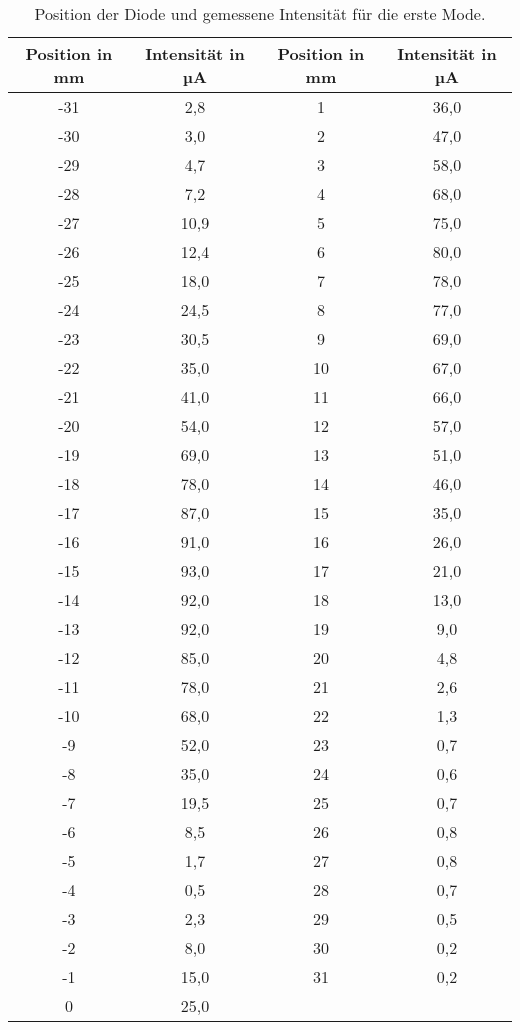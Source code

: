     \begin{table}
      \centering
      \begin{tabular}{c c | c c}
        \toprule
        Position in mm & Intensität in µA & Position in mm & Intensität in µA\\
        \midrule
        -31  &  2,8  &    1  & 36,0\\
        -30  &  3,0  &    2  & 47,0\\
        -29  &  4,7  &    3  & 58,0\\
        -28  &  7,2  &    4  & 68,0\\
        -27  & 10,9  &    5  & 75,0\\
        -26  & 12,4  &    6  & 80,0\\
        -25  & 18,0  &    7  & 78,0\\
        -24  & 24,5  &    8  & 77,0\\
        -23  & 30,5  &    9  & 69,0\\
        -22  & 35,0  &   10  & 67,0\\
        -21  & 41,0  &   11  & 66,0\\
        -20  & 54,0  &   12  & 57,0\\
        -19  & 69,0  &   13  & 51,0\\
        -18  & 78,0  &   14  & 46,0\\
        -17  & 87,0  &   15  & 35,0\\
        -16  & 91,0  &   16  & 26,0\\
        -15  & 93,0  &   17  & 21,0\\
        -14  & 92,0  &   18  & 13,0\\
        -13  & 92,0  &   19  &  9,0\\
        -12  & 85,0  &   20  &  4,8\\
        -11  & 78,0  &   21  &  2,6\\
        -10  & 68,0  &   22  &  1,3\\
         -9  & 52,0  &   23  &  0,7\\
         -8  & 35,0  &   24  &  0,6\\
         -7  & 19,5  &   25  &  0,7\\
         -6  &  8,5  &   26  &  0,8\\
         -5  &  1,7  &   27  &  0,8\\
         -4  &  0,5  &   28  &  0,7\\
         -3  &  2,3  &   29  &  0,5\\
         -2  &  8,0  &   30  &  0,2\\
         -1  & 15,0  &   31  &  0,2\\
          0  & 25,0\\
        \bottomrule
      \end{tabular}
      \caption{Position der Diode und gemessene Intensität für die erste Mode.}
      \label{tab:erstemode}
    \end{table}

